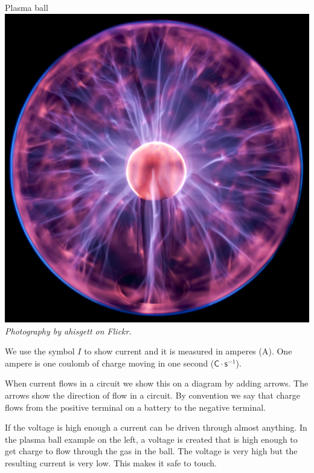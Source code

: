 
\begin{minipage}{.5\textwidth}
\begin{center}
Plasma ball\\
\includegraphics[width=.8\textwidth]{photos/plasmaball_by_ahisgett.jpg}\\
\textit{Photography by ahisgett on Flickr.}
\end{center}   
\end{minipage}
\begin{minipage}{.5\textwidth}
We use the symbol $I$ to show current and it is measured in amperes (A). One ampere is one coulomb of charge moving in one second ($\mathsf{C} \cdot \mathsf{s}^{-1}$).

When current flows in a circuit we show this on a diagram by adding arrows. The arrows show the direction of flow in a circuit. By convention we say that charge flows from the positive terminal on a battery to the negative terminal. 

If the voltage is high enough a current can be driven through almost anything. In the plasma ball example on the left, a voltage is created that is high enough to get charge to flow through the gas in the ball. The voltage is very high but the resulting current is very low. This makes it safe to touch.
\end{minipage}
